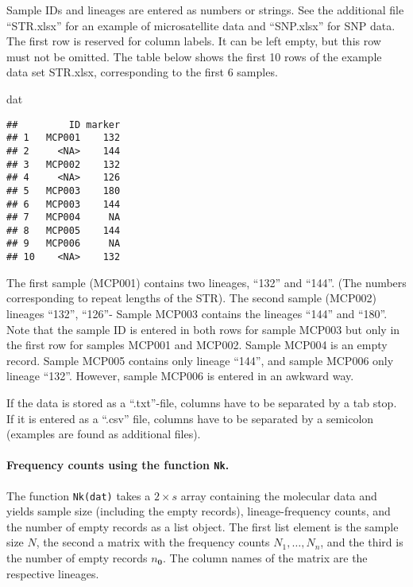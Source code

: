 \documentclass[
]{article}
\newenvironment{Shaded}{\begin{snugshade}}{\end{snugshade}}
\newcommand{\NormalTok}[1]{#1}
\begin{document}
Sample IDs and lineages are entered as numbers or strings. See the
additional file ``STR.xlsx'' for an example of microsatellite data and
``SNP.xlsx'' for SNP data. The first row is reserved for column labels.
It can be left empty, but this row must not be omitted. The table below
shows the first 10 rows of the example data set STR.xlsx, corresponding
to the first 6 samples.

\begin{Shaded}
\begin{Highlighting}[]
\NormalTok{dat}
\end{Highlighting}
\end{Shaded}

\begin{verbatim}
##         ID marker
## 1   MCP001    132
## 2     <NA>    144
## 3   MCP002    132
## 4     <NA>    126
## 5   MCP003    180
## 6   MCP003    144
## 7   MCP004     NA
## 8   MCP005    144
## 9   MCP006     NA
## 10    <NA>    132
\end{verbatim}

The first sample (MCP001) contains two lineages, ``132'' and ``144''.
(The numbers corresponding to repeat lengths of the STR). The second
sample (MCP002) lineages ``132'', ``126''- Sample MCP003 contains the
lineages ``144'' and ``180''. Note that the sample ID is entered in both
rows for sample MCP003 but only in the first row for samples MCP001 and
MCP002. Sample MCP004 is an empty record. Sample MCP005 contains only
lineage ``144'', and sample MCP006 only lineage ``132''. However, sample
MCP006 is entered in an awkward way.

If the data is stored as a ``.txt''-file, columns have to be separated
by a tab stop. If it is entered as a ``.csv'' file, columns have to be
separated by a semicolon (examples are found as additional files).

\hypertarget{frequency-counts-using-the-function-nk.}{%
\paragraph{\texorpdfstring{Frequency counts using the function
\texttt{Nk}.}{Frequency counts using the function Nk.}}\label{frequency-counts-using-the-function-nk.}}

The function \texttt{Nk(dat)} takes a \(2\times s\) array containing the
molecular data and yields sample size (including the empty records),
lineage-frequency counts, and the number of empty records as a list
object. The first list element is the sample size \(N\), the second a
matrix with the frequency counts \(N_1,\ldots, N_n\), and the third is
the number of empty records \(n_{\pmb 0}\). The column names of the
matrix are the respective lineages.
\end{document}
